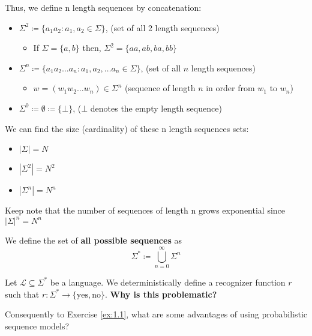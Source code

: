\documentclass[12pt, twoside]{article}
\begin{document}
Thus, we define n length sequences by concatenation:
\begin{itemize}
    \item $\Sigma^2 \coloneqq \{a_1a_2:a_1,a_2 \in \Sigma\}$, (set of all 2 length sequences)
    \begin{itemize}[label=$\circ$]
        \item If $\Sigma=\{a,b\}$ then, $\Sigma^2=\{aa,ab,ba,bb\}$
    \end{itemize}
    \item $\Sigma^n\coloneqq \{a_1a_2\dots a_n:a_1,a_2,\dots a_n \in \Sigma\} $, (set of all $n$ length sequences)
    \begin{itemize}
        \item $w = (w_1w_2\dots w_n)\in\Sigma^n$ (sequence of length $n$ in order from $w_1 \text{ to } w_n$)
    \end{itemize}
    \item $\Sigma^0 \coloneqq \emptyset \coloneqq \{\bot\}$, ($\bot$ denotes the empty length sequence)
\end{itemize}

We can find the size (cardinality) of these n length sequences sets:
\begin{itemize}
    \item $|\Sigma| = N$
    \item $|\Sigma^2| = N^2$
    \item $|\Sigma^n| = N^n$
\end{itemize}

\begin{remark}
    Keep note that the number of sequences of length n grows exponential since $|\Sigma|^n=N^n$
\end{remark}

\begin{definition}
    We define the set of \textbf{all possible sequences} as
    \[\Sigma^* \coloneqq \bigcup_{n=0}^{\infty} \Sigma^n \]
\end{definition}

\begin{exercise} \label{ex:1.1}
     Let $\mathcal{L} \subseteq \Sigma^*$ be a language. We deterministically define a recognizer function $r$ such that  $r: \Sigma^* \to \{ \text{yes}, \text{no} \}$. \textbf{Why is this problematic?}
\end{exercise}

\begin{exercise} \label{ex:1.2}
    Consequently to Exercise \ref{ex:1.1}, what are some advantages of using probabilistic sequence models?
\end{exercise}
\end{document}
